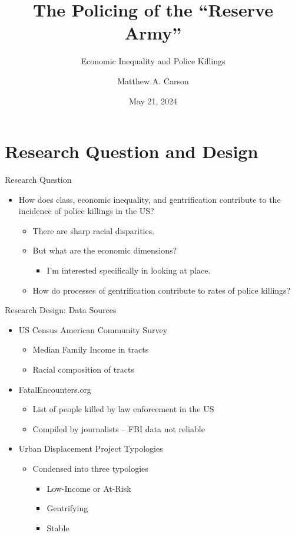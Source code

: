 \documentclass{beamer}
\title{The Policing of the “Reserve Army”}
\subtitle{Economic Inequality and Police Killings}
\author{Matthew A. Carson}\date{May 21, 2024}
\begin{document}
\begin{frame}
  \titlepage
\end{frame}

\section{Research Question and Design}
\begin{frame}{Research Question}
	\begin{itemize}
		\item How does class, economic inequality, and gentrification contribute to the incidence of police killings in the US? \pause
		\begin{itemize}
			\item There are sharp racial disparities.
			\item But what are the economic dimensions? \pause
			\begin{itemize}
				\item I'm interested specifically in looking at place. \pause
			\end{itemize}
			\item How do processes of gentrification contribute to rates of police killings?
		\end{itemize}		
	\end{itemize}
\end{frame}

\begin{frame}{Research Design: Data Sources}
	\begin{itemize}
	\item US Census American Community Survey
		\begin{itemize}
			\item Median Family Income in tracts
			\item Racial composition of tracts
		\end{itemize} \pause
	\item FatalEncounters.org
		\begin{itemize}
			\item List of people killed by law enforcement in the US
			\item Compiled by journalists -- FBI data not reliable
		\end{itemize} \pause
	\item Urban Displacement Project Typologies \nocite{udpDisplacementGentrificationTypologies2023}
		\begin{itemize}
			\item Condensed into three typologies
			\begin{itemize}
				\item Low-Income or At-Risk
				\item Gentrifying
				\item Stable
			\end{itemize}
		\end{itemize}
	\end{itemize}
\end{frame}
\end{document}
